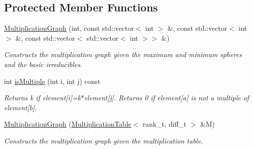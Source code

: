 \subsection*{Protected Member Functions}
\begin{DoxyCompactItemize}
\item 
\hyperlink{classMackey_1_1MultiplicationGraph_a3f974791242d9e13ddca520df4265aca}{Multiplication\+Graph} (int, const std\+::vector$<$ int $>$ \&, const std\+::vector$<$ int $>$ \&, const std\+::vector$<$ std\+::vector$<$ int $>$$>$ \&)
\begin{DoxyCompactList}\small\item\em Constructs the multiplication graph given the maximum and minimum spheres and the basic irreducibles. \end{DoxyCompactList}\item 
int \hyperlink{classMackey_1_1MultiplicationGraph_a6ac7e92d6ceb6bc146f855898916449f}{is\+Multiple} (int i, int j) const
\begin{DoxyCompactList}\small\item\em Returns k if element\mbox{[}i\mbox{]}=k$\ast$element\mbox{[}j\mbox{]}. Returns 0 if element\mbox{[}a\mbox{]} is not a multiple of element\mbox{[}b\mbox{]}. \end{DoxyCompactList}\item 
\hyperlink{classMackey_1_1MultiplicationGraph_a62ff705e1f01b6ab2008765f10230e96}{Multiplication\+Graph} (\hyperlink{classMackey_1_1MultiplicationTable}{Multiplication\+Table}$<$ rank\+\_\+t, diff\+\_\+t $>$ \&M)
\begin{DoxyCompactList}\small\item\em Constructs the multiplication graph given the multiplication table. \end{DoxyCompactList}\end{DoxyCompactItemize}
